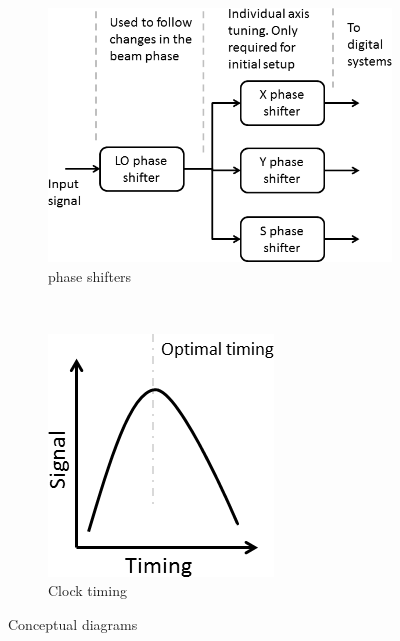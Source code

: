 \documentclass{report}
\begin{document}
\begin{figure}[hbt]
   \centering
    \begin{subfigure}[b]{0.45\textwidth}
        \includegraphics[width=\textwidth]{phase_shifters_overview.png}
        \caption{phase shifters}
        \label{fig:phase_shifters}
    \end{subfigure}
    ~ %
    \begin{subfigure}[b]{0.3\textwidth}
        \includegraphics[width=\textwidth]{timing_overview.png}
        \caption{Clock timing}
        \label{fig:clock_timing}
    \end{subfigure}
    \caption{Conceptual diagrams}\label{fig:Conceptual_diagrams}
\end{figure}
\end{document}
